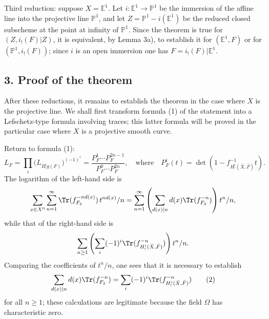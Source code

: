 Third reduction: suppose $X=\mathbb E^1$. Let $i:\mathbb E^1\to\mathbb P^1$ be the immersion of the affine line into the projective line $\mathbb P^1$, and let $Z=\mathbb P^1-i(\mathbb E^1)$ be the reduced closed subscheme at the point at infinity of $\mathbb P^1$. Since the theorem is true for $(Z,i_!(F)|Z)$, it is equivalent, by Lemma 3a), to establish it for $(\mathbb E^1,F)$ or for $(\mathbb P^1,i_!(F))$; since $i$ is an open immersion one has $F=i_!(F)|\mathbb E^1$.

\subsection*{3. Proof of the theorem}

After these reductions, it remains to establish the theorem in the case where $X$ is the projective line. We shall first transform formula (1) of the statement into a Lefschetz-type formula involving traces; this latter formula will be proved in the particular case where $X$ is a projective smooth curve.

Return to formula (1):
\[
L_F=\prod_i\bigl(L_{R^i_!g(F)}\bigr)^{(-1)^i}
=\frac{P_F^1\cdots P_F^{2n-1}}{P_F^0\cdots P_F^{2n}},
\quad\text{where}\quad
P_F^i(t)=\det(1-f^{-1}_{H^i_!(\bar X,\bar F)}t).
\]
The logarithm of the left-hand side is
\[
\sum_{x\in X^0}\sum_{n=1}^{\infty}\Tr(f_{F_{\bar x}}^{-n d(x)})\,t^{n d(x)}/n
=\sum_{n=1}^{\infty}\left(\sum_{d(x)|n} d(x)\Tr(f_{F_{\bar x}}^{-n})\right)t^n/n,
\]
while that of the right-hand side is
\[
\sum_{n\ge1}\left(\sum_i(-1)^i\Tr(f^{-n}_{H^i_!(\bar X,\bar F)})\right)t^n/n.
\]
Comparing the coefficients of $t^n/n$, one sees that it is necessary to establish
\[
\sum_{d(x)|n}d(x)\Tr(f_{F_{\bar x}}^{-n})
=\sum_i(-1)^i\Tr(f^{-n}_{H^i_!(\bar X,\bar F)})
\tag{2}
\]
for all $n\ge1$; these calculations are legitimate because the field $\Omega$ has characteristic zero.

